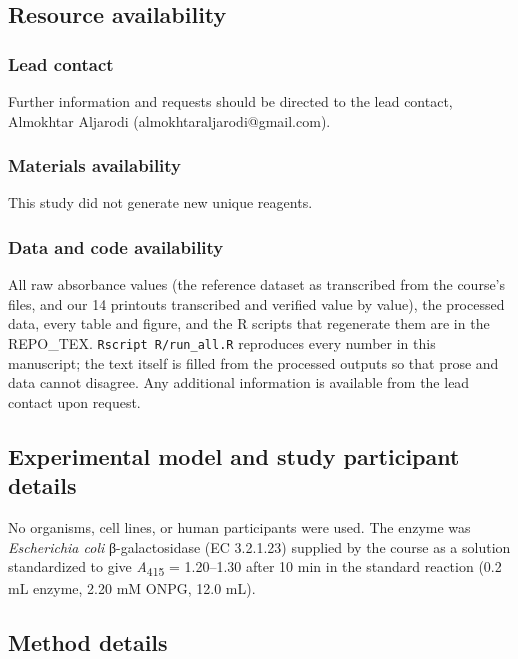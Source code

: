 \documentclass[9pt,twocolumn]{extarticle}
\newcommand{\Aa}{\textit{A}\textsubscript{415}}
\newcommand{\Ecoli}{\textit{Escherichia coli}}
\newcommand{\dash}{–}
\begin{document}
\subsection{Resource availability}
\subsubsection{Lead contact}
Further information and requests should be directed to the lead contact, Almokhtar Aljarodi (almokhtaraljarodi@gmail.com).
\subsubsection{Materials availability}
This study did not generate new unique reagents.
\subsubsection{Data and code availability}
All raw absorbance values (the reference dataset as transcribed from the course's files, and our 14 printouts transcribed and verified value by value), the processed data, every table and figure, and the R scripts that regenerate them are in the {{REPO_TEX}}. \texttt{Rscript R/run\_all.R} reproduces every number in this manuscript; the text itself is filled from the processed outputs so that prose and data cannot disagree. Any additional information is available from the lead contact upon request.

\subsection{Experimental model and study participant details}
No organisms, cell lines, or human participants were used. The enzyme was \Ecoli{} β-galactosidase (EC 3.2.1.23) supplied by the course as a solution standardized to give \Aa{} = 1.20\dash 1.30 after 10 min in the standard reaction (0.2 mL enzyme, 2.20 mM ONPG, 12.0 mL).

\subsection{Method details}
\end{document}
